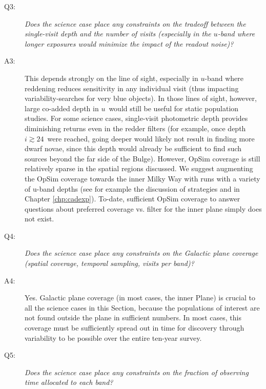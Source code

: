 \begin{description}
 \item[Q3:] {\it Does the science case place any constraints on the
 tradeoff between the single-visit depth and the number of visits
 (especially in the $u$-band where longer exposures would minimize the
 impact of the readout noise)?}

\item[A3:] This depends strongly on the line of sight,
  especially in $u$-band where reddening reduces sensitivity in any
  individual visit (thus impacting variability-searches for very blue
  objects). In those lines of sight, however, large co-added depth in
  $u$~would still be useful for static population studies. For some
  science cases, single-visit photometric depth provides diminishing
  returns even in the redder filters (for example, once depth
  $i\gtrsim 24$~were reached, going deeper would likely not result in
  finding more dwarf novae, since this depth would already be
  sufficient to find such sources beyond the far side of the
  Bulge). However, OpSim coverage is still relatively sparse in the
  spatial regions discussed. We suggest augmenting the OpSim coverage
  towards the inner Milky Way with runs with a variety of u-band
  depths (see for example the discussion of strategies
   and
   in Chapter
  \ref{chp:cadexp}). To-date, sufficient OpSim coverage to answer
  questions about preferred coverage vs. filter for the inner plane
  simply does not exist.

 \item[Q4:] {\it Does the science case place any constraints on the
 Galactic plane coverage (spatial coverage, temporal sampling, visits per
 band)?}

 \item[A4:] Yes. Galactic plane coverage (in most cases, the inner Plane)
   is crucial to all the science cases in this Section, because the
   populations of interest are not found outside the plane in
   sufficient numbers. In most cases, this coverage must be
   sufficiently spread out in time for discovery through variability
   to be possible over the entire ten-year survey.

 \item[Q5:] {\it Does the science case place any constraints on the
 fraction of observing time allocated to each band?}


\end{description}
